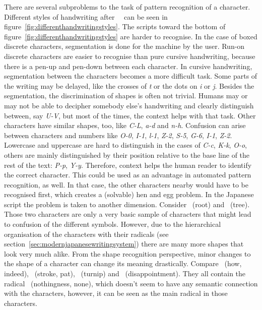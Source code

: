 There are several subproblems to the task of pattern recognition of a character.
Different styles of handwriting after~~\citeyear{Tappert1990} can be seen in 
figure~\ref{fig:differenthandwritingstyles}.
The scripts toward the bottom of figure~\ref{fig:differenthandwritingstyles} 
are harder to recognise. In the case of boxed discrete characters, segmentation 
is done for the machine by the user. Run-on discrete characters are easier to 
recognise than pure cursive handwriting, because there is a pen-up and 
pen-down between each character. In cursive handwriting, segmentation 
between the characters becomes a more difficult task. Some parts of the writing
may be delayed, like the crosses of \emph{t} or the dots on \emph{i} or \emph{j}.
Besides the segmentation, the discrimination of shapes is often not trivial.
Humans may or may not be able to decipher somebody else's handwriting and clearly
distinguish between, say \emph{U-V}, but most of the times, the context helps 
with that task. Other characters have similar shapes, too, 
like \emph{C-L}, \emph{a-d} and \emph{n-h}. 
Confusion can arise between characters and numbers like 
\emph{O-0}, \emph{I-1}, \emph{l-1}, \emph{Z-2}, \emph{S-5}, \emph{G-6}, 
\emph{I-1}, \emph{Z-2}. Lowercase and uppercase are hard to distinguish in the
cases of \emph{C-c}, \emph{K-k}, \emph{O-o}, others are mainly distinguished 
by their position relative to the base line of the rest of the text: 
\emph{P-p}, \emph{Y-y}. Therefore, context helps the human reader to identify
the correct character. This could be used as an advantage in automated pattern
recognition, as well. In that case, the other characters nearby would have to be
recognised first, which creates a (solvable) hen and egg problem.
In the Japanese script the problem is taken to another dimension. 
Consider ~(root) and ~(tree). Those two characters are only a 
very basic sample of characters that might lead to confusion of the different 
symbols. However, due to the hierarchical organisation of the characters 
with their radicals (see section~\ref{sec:modernjapanesewritingsystem}) there 
are many more shapes that look very much alike. From the shape recognition 
perspective, minor changes to the shape of a character can change its meaning 
drastically.
Compare ~(how, indeed), ~(stroke, pat), ~(turnip) and
~(disappointment). They all contain the radical 
~(nothingness, none), which doesn't seem to have any semantic connection
with the characters, however, it can be seen as the main radical in those 
characters.

